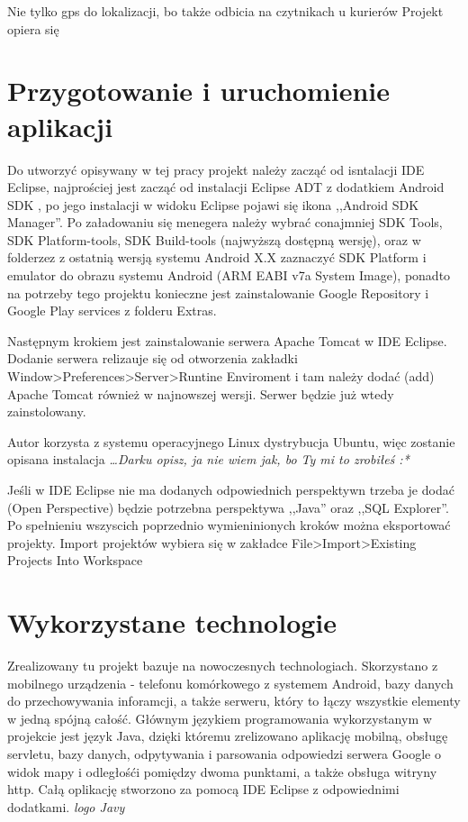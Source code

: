 \documentclass[eng,printmode,oneside]{mgr}
\begin{document}
 Nie tylko gps do lokalizacji, bo także odbicia
na czytnikach u kurierów Projekt opiera się 

\chapter{Przygotowanie i uruchomienie aplikacji}

Do utworzyć opisywany w tej pracy projekt należy zacząć od isntalacji IDE
Eclipse,  najprościej jest zacząć od instalacji Eclipse ADT z dodatkiem Android
SDK \cite{eclipse}, po jego instalacji w widoku Eclipse pojawi się ikona
,,Android SDK Manager''. Po załadowaniu się menegera należy wybrać conajmniej
SDK Tools, SDK Platform-tools, SDK Build-tools (najwyższą dostępną wersję), oraz w
folderzez z ostatnią wersją systemu Android X.X zaznaczyć SDK Platform i
emulator do obrazu systemu Android (ARM EABI v7a System Image), ponadto na
potrzeby tego projektu konieczne jest zainstalowanie Google Repository i Google
Play services z folderu Extras.

Następnym krokiem jest zainstalowanie serwera Apache Tomcat w IDE Eclipse.
Dodanie serwera relizauje się od otworzenia zakładki
Window>Preferences>Server>Runtine Enviroment i tam należy dodać (add) Apache
Tomcat również w najnowszej wersji. Serwer będzie już wtedy zainstolowany. 

Autor korzysta z systemu operacyjnego Linux dystrybucja Ubuntu, więc zostanie
opisana instalacja \emph{\color{komentarz}\ldots Darku opisz, ja nie wiem jak,
bo Ty mi to zrobiłeś :*}

Jeśli w IDE Eclipse nie ma dodanych odpowiednich perspektywn trzeba je dodać
(Open Perspective) będzie potrzebna perspektywa ,,Java'' oraz ,,SQL Explorer''.
Po spełnieniu wszyscich poprzednio wymieninionych kroków można eksportować
projekty. Import projektów wybiera się w zakładce File>Import>Existing Projects
Into Workspace

\chapter{Wykorzystane technologie}

Zrealizowany tu projekt bazuje na nowoczesnych technologiach.
Skorzystano z mobilnego urządzenia - telefonu komórkowego z systemem
Android, bazy danych do przechowywania inforamcji, a także serweru, który to
łączy wszystkie elementy w jedną spójną całość. Głównym językiem
programowania wykorzystanym w projekcie jest język Java, dzięki któremu
zrelizowano aplikację mobilną, obsługę servletu, bazy danych, odpytywania i
parsowania odpowiedzi serwera Google o widok mapy i odległośći pomiędzy dwoma
punktami, a także obsługa witryny http. Całą oplikację stworzono za pomocą IDE
Eclipse z odpowiednimi dodatkami.
\emph{\color{komentarz}logo Javy}
\end{document}
